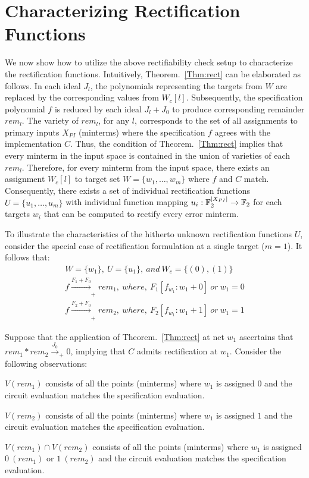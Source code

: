 \section{Characterizing Rectification Functions}

We now show how to utilize the above rectifiability check setup to 
characterize the rectification functions.  
Intuitively, Theorem.~\ref{Thm:rect} can be elaborated as follows.
In each ideal $J_l$, the polynomials representing the targets from
$W$ are replaced by the corresponding values from $W_c[l]$. 
Subsequently, the specification polynomial $f$ is reduced by 
each ideal $J_l+J_0$ to produce corresponding remainder $rem_l$. 
The variety of $rem_l$, for any $l$, corresponds to the set of
all assignments to primary inputs $X_{PI}$ (minterms) where the
specification $f$ agrees with the implementation $C$. Thus, the
condition of Theorem.~\ref{Thm:rect} implies that every minterm in the 
input space is contained in the union of varieties of each $rem_l$. 
Therefore, for every minterm from the input space, there exists an assignment
$W_c[l]$ to target set $W = \{w_1,\dots,w_m\}$ where $f$ and $C$ match. Consequently, there
exists a set of individual rectification functions $U=\{u_1,\dots,u_m\}$ with individual function 
mapping $u_i:{\mathbb{F}}_{2}^{|X_{PI}|}\rightarrow {\mathbb{F}}_{2}$ for each targets $w_i$ that 
can be computed to rectify every error minterm. 

To illustrate the characteristics of the hitherto unknown rectification functions $U$,
consider the special case of rectification formulation at a single target ($m=1$).
It follows that:  
\begin{align*}
W=\{w_1\},~U=\{u_1\},~and~W_c = \{(0),(1)\}\\
f \xrightarrow[]{F_1 + F_{0}}_+rem_1,~where,~F_1[f_{w_1}: w_1 + 0]~or~w_1=0\\
f \xrightarrow[]{F_2 + F_{0}}_+rem_2,~where,~F_2[f_{w_1}: w_1 + 1]~or~w_1=1
\end{align*}

Suppose that the application of Theorem.~\ref{Thm:rect} at net $w_1$ ascertains
that $rem_1*rem_2\xrightarrow{J_0}_+0$, implying that $C$ admits rectification 
at $w_1$. 
Consider the following observations:

\bi
\item $V(rem_1)$ consists of all the points (minterms) where $w_1$ is assigned $0$ and the circuit evaluation matches
the specification evaluation.
\item $V(rem_2)$ consists of all the points (minterms) where $w_1$ is assigned $1$ and the circuit evaluation matches
the specification evaluation.
\item $V(rem_1) \cap V(rem_2)$ consists of all the points (minterms) where $w_1$ is assigned $0~(rem_1)$ or $1~(rem_2)$ and the circuit evaluation matches the specification evaluation.
\ei

